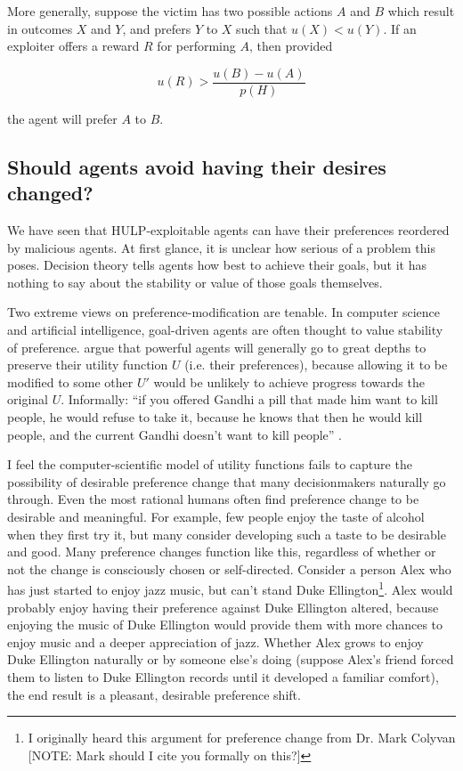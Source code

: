 \documentclass{article}
\begin{document}
More generally, suppose the victim has two possible actions \(A\) and \(B\) which result in outcomes \(X\) and \(Y\), and prefers \(Y\) to \(X\) such that \(u(X)<u(Y)\). If an exploiter offers a reward \(R\) for performing \(A\), then provided

\[u(R) > \frac{u(B)-u(A)}{p(H)}\]

the agent will prefer \(A\) to \(B\).

\subsection{Should agents avoid having their desires changed?}

We have seen that HULP-exploitable agents can have their preferences reordered by malicious agents. At first glance, it is unclear how serious of a problem this poses. Decision theory tells agents how best to achieve their goals, but it has nothing to say about the stability or value of those goals themselves.

Two extreme views on preference-modification are tenable. In computer science and artificial intelligence, goal-driven agents are often thought to value stability of preference. \citep{omohundro2008basic,bostrom2012will} argue that powerful agents will generally go to great depths to preserve their utility function \(U\) (i.e. their preferences), because allowing it to be modified to some other \(U'\) would be unlikely to achieve progress towards the original \(U\). Informally: ``if you offered Gandhi a pill that made him want to kill people, he would refuse to take it, because he knows that then he would kill people, and the current Gandhi doesn’t want to kill people'' \citep{1_yudkowsky_2012}. 

I feel the computer-scientific model of utility functions fails to capture the possibility of desirable preference change that many decisionmakers naturally go through. Even the most rational humans often find preference change to be desirable and meaningful. For example, few people enjoy the taste of alcohol when they first try it, but many consider developing such a taste to be desirable and good. Many preference changes function like this, regardless of whether or not the change is consciously chosen or self-directed. Consider a person Alex who has just started to enjoy jazz music, but can't stand Duke Ellington\footnote{I originally heard this argument for preference change from Dr. Mark Colyvan [NOTE: Mark should I cite you formally on this?]}. Alex would probably enjoy having their preference against Duke Ellington altered, because enjoying the music of Duke Ellington would provide them with more chances to enjoy music and a deeper appreciation of jazz. Whether Alex grows to enjoy Duke Ellington naturally or by someone else's doing (suppose Alex's friend forced them to listen to Duke Ellington records until it developed a familiar comfort), the end result is a pleasant, desirable preference shift.
\end{document}
